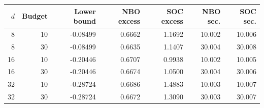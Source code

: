 \begin{tabular}{r r r r r r r}
\toprule
$d$ & Budget & Lower bound & NBO excess & SOC excess & NBO sec. & SOC sec. \\
\midrule
8 & 10 & -0.08499 & 0.6662 & 1.1692 & 10.002 & 10.006 \\
8 & 30 & -0.08499 & 0.6635 & 1.1407 & 30.004 & 30.008 \\
16 & 10 & -0.20446 & 0.6707 & 0.9938 & 10.002 & 10.005 \\
16 & 30 & -0.20446 & 0.6674 & 1.0500 & 30.004 & 30.006 \\
32 & 10 & -0.28724 & 0.6686 & 1.4883 & 10.003 & 10.007 \\
32 & 30 & -0.28724 & 0.6672 & 1.3090 & 30.003 & 30.007 \\
\bottomrule
\end{tabular}
